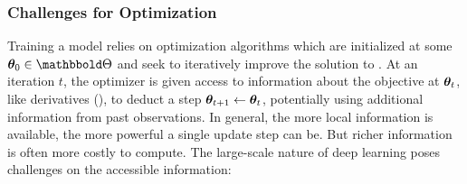 \subsubsection{Challenges for Optimization}

Training a model relies on optimization algorithms which are initialized at some
$\vtheta_{0}\in \sTheta$ and seek to iteratively improve the solution to
. At an iteration $t$, the
optimizer is given access to information about the objective at ${\bm{\theta}}_t$,
like derivatives (), to deduct a
step ${\bm{\theta}}_{t+1} \leftarrow {\bm{\theta}}_t$, potentially using additional
information from past observations. In general, the more local information is
available, the more powerful a single update step can be. But richer information
is often more costly to compute. The large-scale nature of deep learning poses
challenges on the accessible information:
